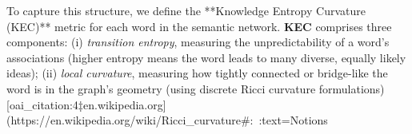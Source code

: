 To capture this structure, we define the **Knowledge Entropy Curvature (KEC)** metric for each word in the semantic network. \textbf{KEC} comprises three components: (i) \textit{transition entropy}, measuring the unpredictability of a word’s associations (higher entropy means the word leads to many diverse, equally likely ideas); (ii) \textit{local curvature}, measuring how tightly connected or bridge-like the word is in the graph’s geometry (using discrete Ricci curvature formulations) [oai_citation:4‡en.wikipedia.org](https://en.wikipedia.org/wiki/Ricci_curvature#:~:text=Notions%

